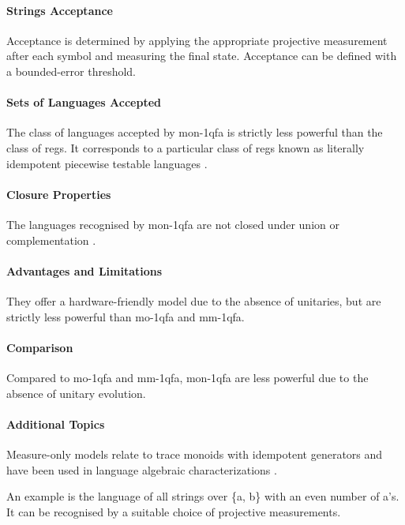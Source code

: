 \paragraph{Strings Acceptance}
Acceptance is determined by applying the appropriate projective measurement after each symbol and measuring the final state. Acceptance can be defined with a bounded-error threshold.

\paragraph{Sets of Languages Accepted}
The class of languages accepted by \gls{mon-1qfa} is strictly less powerful than the class of \glspl{reg}. It corresponds to a particular class of \glspl{reg} known as literally idempotent piecewise testable languages \cite{bertoni2010trace}.

\paragraph{Closure Properties}
The languages recognised by \gls{mon-1qfa} are not closed under union or complementation \cite{bertoni2010trace}.

\paragraph{Advantages and Limitations}
They offer a hardware-friendly model due to the absence of unitaries, but are strictly less powerful than \gls{mo-1qfa} and \gls{mm-1qfa}.

\paragraph{Comparison}
Compared to \gls{mo-1qfa} and \gls{mm-1qfa}, \gls{mon-1qfa} are less powerful due to the absence of unitary evolution.

\paragraph{Additional Topics}
Measure-only models relate to trace monoids with idempotent generators and have been used in language algebraic characterizations \cite{comin2013extended, bertoni2010trace}.

\begin{example}
An example is the language of all strings over \{a, b\} with an even number of a's. It can be recognised by a suitable choice of projective measurements.
\end{example}

